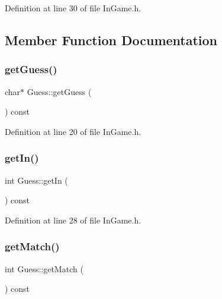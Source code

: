 Definition at line 30 of file In\+Game.\+h.



\subsection{Member Function Documentation}
\hypertarget{class_guess_a1dee40f37057ed976a81cfdd2a6c339d}{}\label{class_guess_a1dee40f37057ed976a81cfdd2a6c339d} 
\subsubsection{\texorpdfstring{get\+Guess()}{getGuess()}}
{\footnotesize\ttfamily char$\ast$ Guess\+::get\+Guess (\begin{DoxyParamCaption}{ }\end{DoxyParamCaption}) const\hspace{0.3cm}{\ttfamily [inline]}}



Definition at line 20 of file In\+Game.\+h.

\hypertarget{class_guess_ad3041838f2be39598a9ccbe29ae610cc}{}\label{class_guess_ad3041838f2be39598a9ccbe29ae610cc} 
\subsubsection{\texorpdfstring{get\+In()}{getIn()}}
{\footnotesize\ttfamily int Guess\+::get\+In (\begin{DoxyParamCaption}{ }\end{DoxyParamCaption}) const\hspace{0.3cm}{\ttfamily [inline]}}



Definition at line 28 of file In\+Game.\+h.

\hypertarget{class_guess_aff08c12fd1bd55b14cd9d7683a7c5b06}{}\label{class_guess_aff08c12fd1bd55b14cd9d7683a7c5b06} 
\subsubsection{\texorpdfstring{get\+Match()}{getMatch()}}
{\footnotesize\ttfamily int Guess\+::get\+Match (\begin{DoxyParamCaption}{ }\end{DoxyParamCaption}) const\hspace{0.3cm}{\ttfamily [inline]}}




